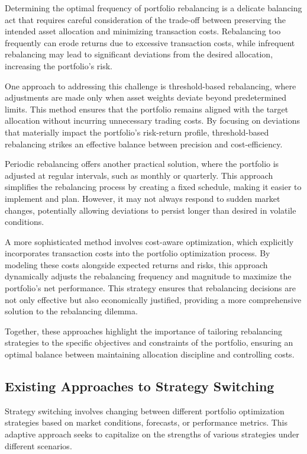 Determining the optimal frequency of portfolio rebalancing is a delicate balancing act that requires careful consideration of the trade-off between preserving the intended asset allocation and minimizing transaction costs. Rebalancing too frequently can erode returns due to excessive transaction costs, while infrequent rebalancing may lead to significant deviations from the desired allocation, increasing the portfolio’s risk.

One approach to addressing this challenge is threshold-based rebalancing, where adjustments are made only when asset weights deviate beyond predetermined limits. This method ensures that the portfolio remains aligned with the target allocation without incurring unnecessary trading costs. By focusing on deviations that materially impact the portfolio's risk-return profile, threshold-based rebalancing strikes an effective balance between precision and cost-efficiency.

Periodic rebalancing offers another practical solution, where the portfolio is adjusted at regular intervals, such as monthly or quarterly. This approach simplifies the rebalancing process by creating a fixed schedule, making it easier to implement and plan. However, it may not always respond to sudden market changes, potentially allowing deviations to persist longer than desired in volatile conditions.

A more sophisticated method involves cost-aware optimization, which explicitly incorporates transaction costs into the portfolio optimization process. By modeling these costs alongside expected returns and risks, this approach dynamically adjusts the rebalancing frequency and magnitude to maximize the portfolio’s net performance. This strategy ensures that rebalancing decisions are not only effective but also economically justified, providing a more comprehensive solution to the rebalancing dilemma.

Together, these approaches highlight the importance of tailoring rebalancing strategies to the specific objectives and constraints of the portfolio, ensuring an optimal balance between maintaining allocation discipline and controlling costs.

\subsection{Existing Approaches to Strategy Switching}

Strategy switching involves changing between different portfolio optimization strategies based on market conditions, forecasts, or performance metrics. This adaptive approach seeks to capitalize on the strengths of various strategies under different scenarios.

